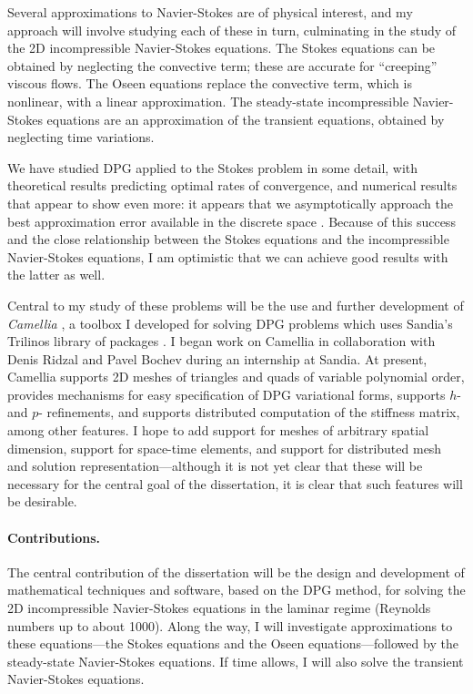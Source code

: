 \documentclass[12pt,c]{article}
\begin{document}
Several approximations to Navier-Stokes are of physical interest, and my approach will involve studying each of these in turn, culminating in the study of the 2D incompressible Navier-Stokes equations.  The Stokes equations can be obtained by neglecting the convective term; these are accurate for ``creeping'' viscous flows.  The Oseen equations replace the convective term, which is nonlinear, with a linear approximation.  The steady-state incompressible Navier-Stokes equations are an approximation of the transient equations, obtained by neglecting time variations.

We have studied DPG applied to the Stokes problem in some detail, with theoretical results predicting optimal rates of convergence, and numerical results that appear to show even more: it appears that we asymptotically approach the best approximation error available in the discrete space \cite{DPGStokes}.  Because of this success and the close relationship between the Stokes equations and the incompressible Navier-Stokes equations, I am optimistic that we can achieve good results with the latter as well.

Central to my study of these problems will be the use and further development of \emph{Camellia} \cite{RobertsetAl11}, a toolbox I developed for solving DPG problems which uses Sandia's Trilinos library of packages \cite{Trilinos}.   I began work on Camellia in collaboration with Denis Ridzal and Pavel Bochev during an internship at Sandia.\nocite{RobertsetAl10}  At present, Camellia supports 2D meshes of triangles and quads of variable polynomial order, provides mechanisms for easy specification of DPG variational forms, supports $h$- and $p$- refinements, and supports distributed computation of the stiffness matrix, among other features.  I hope to add support for meshes of arbitrary spatial dimension, support for space-time elements, and support for distributed mesh and solution representation---although it is not yet clear that these will be necessary for the central goal of the dissertation, it is clear that such features will be desirable.

\paragraph{Contributions.} The central contribution of the dissertation will be the design and development of mathematical techniques and software, based on the DPG method, for solving the 2D incompressible Navier-Stokes equations in the laminar regime (Reynolds numbers up to about 1000).  Along the way, I will investigate approximations to these equations---the Stokes equations and the Oseen equations---followed by the steady-state Navier-Stokes equations.  If time allows, I will also solve the transient Navier-Stokes equations.
\end{document}
